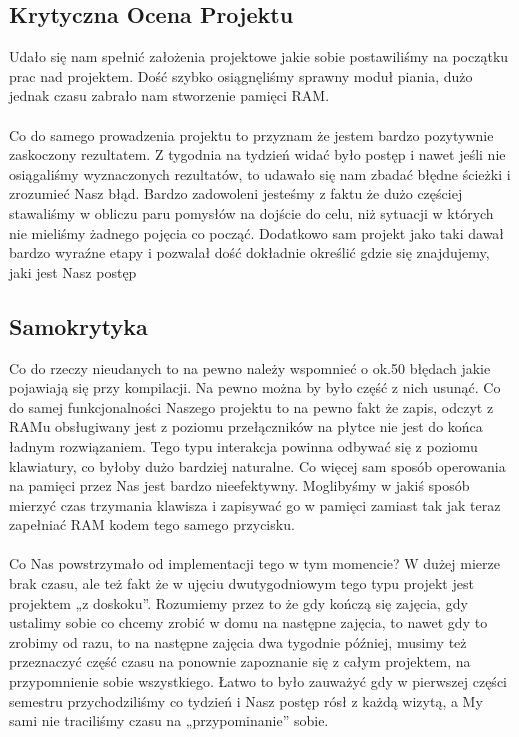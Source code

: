 \documentclass[11pt]{article}
\begin{document}
	\subsection{Krytyczna Ocena Projektu}
	Udało się nam spełnić założenia projektowe jakie sobie postawiliśmy na początku prac nad projektem. Dość szybko osiągnęliśmy sprawny moduł piania, dużo jednak czasu zabrało nam stworzenie pamięci RAM. \\\\Co do samego prowadzenia projektu to przyznam że jestem bardzo pozytywnie zaskoczony rezultatem. Z tygodnia na tydzień widać było postęp i nawet jeśli nie osiągaliśmy wyznaczonych rezultatów, to udawało się nam zbadać błędne ścieżki i zrozumieć Nasz błąd. Bardzo zadowoleni jesteśmy z faktu że dużo częściej stawaliśmy w obliczu paru pomysłów na dojście do celu, niż sytuacji w których nie mieliśmy żadnego pojęcia co począć. Dodatkowo sam projekt jako taki dawał bardzo wyraźne etapy i pozwalał dość dokładnie określić gdzie się znajdujemy, jaki jest Nasz postęp
	\subsection{Samokrytyka}
	Co do rzeczy nieudanych to na pewno należy wspomnieć o ok.50 błędach jakie pojawiają się przy kompilacji. Na pewno można by było część z nich usunąć. Co do samej funkcjonalności Naszego projektu to na pewno fakt że zapis, odczyt z RAMu obsługiwany jest z poziomu przełączników na płytce nie jest do końca ładnym rozwiązaniem. Tego  typu interakcja powinna odbywać się z poziomu klawiatury, co byłoby dużo bardziej naturalne. Co więcej sam sposób operowania na pamięci przez Nas jest bardzo nieefektywny. Moglibyśmy w jakiś sposób mierzyć czas trzymania klawisza i zapisywać go w pamięci zamiast tak jak teraz zapełniać RAM kodem tego samego przycisku. \\\\Co Nas powstrzymało od implementacji tego w tym momencie? W dużej mierze brak czasu, ale też fakt że w ujęciu dwutygodniowym tego typu projekt jest projektem „z doskoku”. Rozumiemy przez to że gdy kończą się zajęcia, gdy ustalimy sobie co chcemy zrobić w domu na następne zajęcia, to nawet gdy to zrobimy od razu, to na następne zajęcia dwa tygodnie później, musimy też przeznaczyć część czasu na ponownie zapoznanie się z całym projektem, na przypomnienie sobie wszystkiego. Łatwo to było zauważyć gdy w pierwszej części semestru przychodziliśmy co tydzień i Nasz postęp rósł z każdą wizytą, a My sami nie traciliśmy czasu na „przypominanie” sobie.
\end{document}
